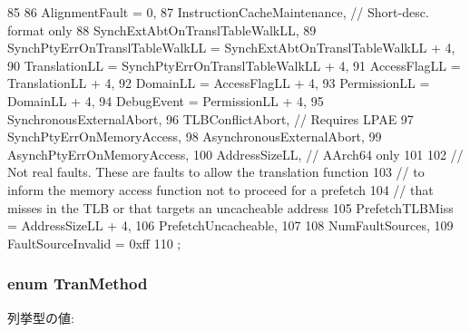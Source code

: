 \begin{DoxyCode}
85     {
86         AlignmentFault = 0,
87         InstructionCacheMaintenance,  // Short-desc. format only
88         SynchExtAbtOnTranslTableWalkLL,
89         SynchPtyErrOnTranslTableWalkLL = SynchExtAbtOnTranslTableWalkLL + 4,
90         TranslationLL = SynchPtyErrOnTranslTableWalkLL + 4,
91         AccessFlagLL = TranslationLL + 4,
92         DomainLL = AccessFlagLL + 4,
93         PermissionLL = DomainLL + 4,
94         DebugEvent = PermissionLL + 4,
95         SynchronousExternalAbort,
96         TLBConflictAbort,  // Requires LPAE
97         SynchPtyErrOnMemoryAccess,
98         AsynchronousExternalAbort,
99         AsynchPtyErrOnMemoryAccess,
100         AddressSizeLL,  // AArch64 only
101 
102         // Not real faults. These are faults to allow the translation function
103         // to inform the memory access function not to proceed for a prefetch
104         // that misses in the TLB or that targets an uncacheable address
105         PrefetchTLBMiss = AddressSizeLL + 4,
106         PrefetchUncacheable,
107 
108         NumFaultSources,
109         FaultSourceInvalid = 0xff
110     };
\end{DoxyCode}
\hypertarget{classArmISA_1_1ArmFault_ad78237d6390becbe8bdf9e73979c56ae}{
\subsubsection[{TranMethod}]{\setlength{\rightskip}{0pt plus 5cm}enum {\bf TranMethod}}}
\label{classArmISA_1_1ArmFault_ad78237d6390becbe8bdf9e73979c56ae}
\begin{Desc}
\item[列挙型の値: ]\par
\begin{description}
\item[{\em 
\hypertarget{classArmISA_1_1ArmFault_ad78237d6390becbe8bdf9e73979c56aea307d48bbc198c224e04bf57415c05dcd}{
LpaeTran}
\label{classArmISA_1_1ArmFault_ad78237d6390becbe8bdf9e73979c56aea307d48bbc198c224e04bf57415c05dcd}
}]\item[{\em 
\hypertarget{classArmISA_1_1ArmFault_ad78237d6390becbe8bdf9e73979c56aeabfef4fbb52d72e0c89f660f2d501a488}{
VmsaTran}
\label{classArmISA_1_1ArmFault_ad78237d6390becbe8bdf9e73979c56aeabfef4fbb52d72e0c89f660f2d501a488}
}]\item[{\em 
\hypertarget{classArmISA_1_1ArmFault_ad78237d6390becbe8bdf9e73979c56aeae6c1c0c9ccfea433b47dcf88c8cea24e}{
UnknownTran}
\label{classArmISA_1_1ArmFault_ad78237d6390becbe8bdf9e73979c56aeae6c1c0c9ccfea433b47dcf88c8cea24e}
}]\end{description}
\end{Desc}




